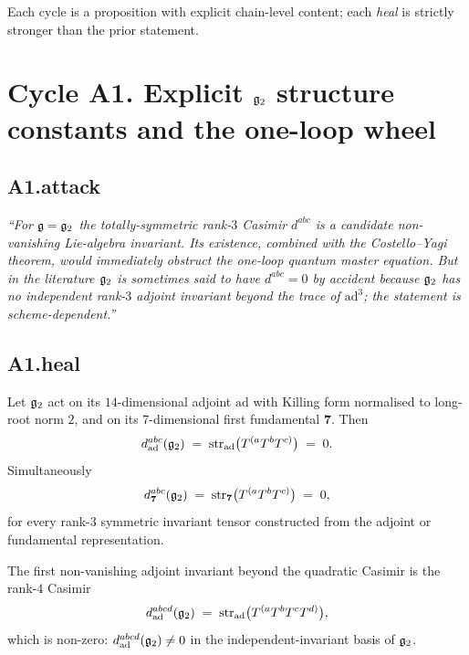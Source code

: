Each cycle is a proposition with explicit chain-level content; each
\emph{heal} is strictly stronger than the prior statement.

\section*{Cycle A1. Explicit $\mathfrak{g}_2$ structure constants and the one-loop
wheel}

\subsection*{A1.attack}

\emph{``For $\mathfrak{g} = \mathfrak{g}_2$ the totally-symmetric rank-$3$ Casimir
$d^{abc}$ is a candidate non-vanishing Lie-algebra invariant. Its
existence, combined with the Costello--Yagi theorem, would immediately
obstruct the one-loop quantum master equation. But in the literature
$\mathfrak{g}_2$ is sometimes said to have $d^{abc} = 0$ by accident because
$\mathfrak{g}_2$ has no independent rank-$3$ adjoint invariant beyond the trace
of $\mathrm{ad}^3$; the statement is scheme-dependent.''}

\subsection*{A1.heal}

\begin{proposition}
\label{prop:r7-g2-dabc-adjoint-vs-fundamental}
Let $\mathfrak{g}_2$ act on its $14$-dimensional adjoint $\mathrm{ad}$ with
Killing form normalised to long-root norm $2$, and on its
$7$-dimensional first fundamental $\mathbf 7$. Then
\begin{equation}
\label{eq:r7-g2-dabc-adj}
 d^{abc}_{\mathrm{ad}}(\mathfrak{g}_2) \;=\;
 \mathrm{str}_{\mathrm{ad}}\bigl(T^{(a} T^b T^{c)}\bigr)
 \;=\; 0.
\end{equation}
Simultaneously
\begin{equation}
\label{eq:r7-g2-dabc-fund}
 d^{abc}_{\mathbf 7}(\mathfrak{g}_2) \;=\;
 \mathrm{str}_{\mathbf 7}\bigl(T^{(a} T^b T^{c)}\bigr)
 \;=\; 0,
\end{equation}
for every rank-$3$ symmetric invariant tensor constructed from the
adjoint or fundamental representation.

The first non-vanishing adjoint invariant beyond the quadratic Casimir
is the rank-$4$ Casimir
\begin{equation}
\label{eq:r7-g2-d4-adj}
 d^{abcd}_{\mathrm{ad}}(\mathfrak{g}_2) \;=\;
 \mathrm{str}_{\mathrm{ad}}\bigl(T^{(a} T^b T^c T^{d)}\bigr),
\end{equation}
which is non-zero: $d^{abcd}_{\mathrm{ad}}(\mathfrak{g}_2) \ne 0$ in the
independent-invariant basis of $\mathfrak{g}_2$.
\end{proposition}


